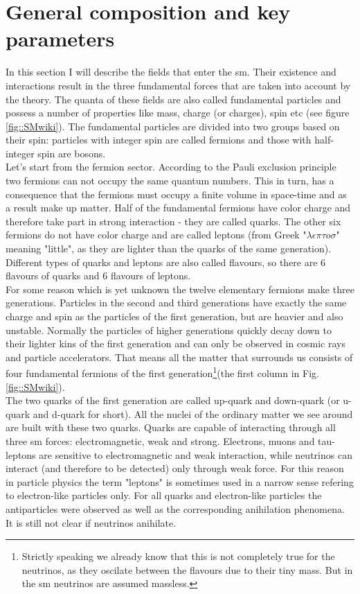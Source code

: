  \section{General composition and key parameters}
 \label{sec::sm_gen}
	In this section I will describe the fields that enter the \gls{sm}. Their existence and interactions result in the three fundamental forces that are taken into account by the theory. The quanta of these fields are also called fundamental particles and possess a number of properties like mass, charge (or charges), spin etc (see figure \ref{fig::SMwiki}). The fundamental particles are divided into two groups based on their spin: particles with integer spin are called fermions and those with half-integer spin are bosons. \\
	Let's start from the fermion sector. According to the Pauli exclusion principle\cite{pep} two fermions can not occupy the same quantum numbers. This in turn, has a consequence that the fermions must occupy a finite volume in space-time and as a result make up matter. Half of the fundamental fermions have color charge and therefore take part in strong interaction - they are called quarks. The other six fermions do not have color charge and are called leptons (from Greek "$\lambda \epsilon \pi \tau o \sigma$" meaning "little", as they are lighter than the quarks of the same generation). Different types of quarks and leptons are also called flavours, so there are 6 flavours of quarks and 6 flavours of leptons.\\
	For some reason which is yet unknown the twelve elementary fermions make three generations. Particles in the second and third generations have exactly the same charge and spin as the particles of the first generation, but are heavier and also unstable.  Normally the particles of higher generations quickly decay down to their lighter kins of the first generation and can only be observed in cosmic rays and particle accelerators. That means all the matter that surrounds us consists of four fundamental fermions of the first generation\footnote{Strictly speaking we already know that this is not completely true for the neutrinos, as they oscilate between the flavours due to their tiny mass. But in the \gls{sm} neutrinos are assumed massless.}(the first column in Fig. \ref{fig::SMwiki}).\\
	The two quarks of the first generation are called up-quark and down-quark (or u-quark and d-quark for short). All the nuclei of the ordinary matter we see around are built with these two quarks. Quarks are capable of interacting through all three \gls{sm} forces: electromagnetic, weak and strong. Electrons, muons and tau-leptons are sensitive to electromagnetic and weak interaction, while neutrinos can interact (and therefore to be detected) only through weak force. For this reason in particle physics the term "leptons" is sometimes used in a narrow sense refering to electron-like particles only. For all quarks and electron-like particles the antiparticles were observed as well as the corresponding anihilation phenomena. It is still not clear if neutrinos anihilate.\\
